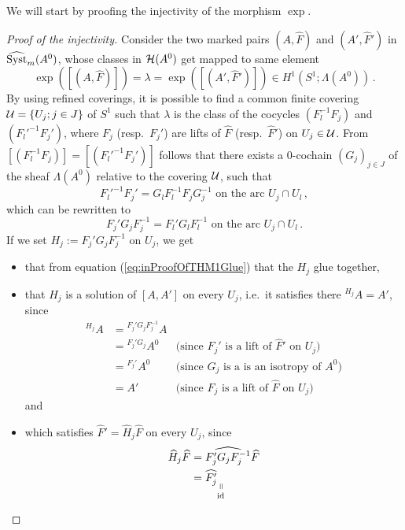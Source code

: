 We will start by proofing the injectivity of the morphism $\exp$.
\begin{proof}[Proof of the injectivity]
  Consider the two marked pairs $(A,\hat F)$ and $(A',\hat F')$ in
  $\widehat{\operatorname{Syst}}_m(A^0)$, whose classes in $\mathcal{H}(A^0)$ get mapped to same element
  \[
    \exp([(A,\hat F)])=\lambda=\exp([(A',\hat F')])
      \in H^1(S^1;\Lambda(A^0)) \,.
  \]
  By using refined coverings, it is possible to find a common finite covering
  $\mathcal{U}=\{U_j;j\in J\}$ of $S^1$ such that $\lambda$ is the class of the
  cocycles $(F_l^{-1}F_j)$ and $(F_l'^{-1}F_j')$, where $F_j$ (resp.\ $F_j'$)
  are lifts of $\hat F$ (resp.\ $\hat F'$) on $U_j\in\mathcal{U}$.
  From $[(F_l^{-1}F_j)]=[(F_l'^{-1}F_j')]$ follows that there exists a
  $0$-cochain $(G_j)_{j\in J}$ of the sheaf $\Lambda(A^0)$ relative to the
  covering $\mathcal{U}$, such that
  \[
    F_l'^{-1}F_j'=G_lF_l^{-1}F_jG_j^{-1}
    \text{~on~the~arc~} U_j\cap U_l \,,
  \]
  which can be rewritten to
  \begin{equation}\label{eq:inProofOfTHM1Glue}
    F_j'G_jF_j^{-1} = F_l'G_lF_l^{-1} \text{~on~the~arc~} U_j\cap U_l \,.
  \end{equation}
  If we set $H_j:=F_j'G_{j}F_j^{-1}$ on $U_{j}$, we get \PROBLEM[refactor!!!]
  \begin{itemize}
    \item that from equation (\ref{eq:inProofOfTHM1Glue}) that the $H_j$ glue
      together\PROBLEM[holomorphic??],
    \item that $H_j$ is a solution of $[A,A']$ on every $U_j$, i.e.\ it
      satisfies there ${}^{H_j}A=A'$, since
      \begin{align*}
        {}^{H_j}A &= {}^{F_j'G_{j}F_j^{-1}}A
        \\&={}^{F_j'G_{j}}A^0
                  & \text{(since $F_j'$ is a lift of $\hat F'$ on $U_j$)}
        \\&={}^{F_j'}A^0
                  & \text{(since $G_j$ is a is an isotropy of $A^0$)}
        \\&=A'
                  & \text{(since $F_j$ is a lift of $\hat F$ on $U_j$)}
      \end{align*}
      and
    \item which satisfies $\hat F'=\hat H_j\hat F$ on every $U_j$, since
      \begin{align*}
        \hat H_j\hat F&= \widehat{F_j'G_{j}F_j^{-1}} \hat F
        \\            &= \hat{F_j'}
        \underset{\id}{%
          \underset{\text{\rotatebox[origin=c]{-90}{$=$}}}{%
}}
\end{align*}
\end{itemize}
\end{proof}
